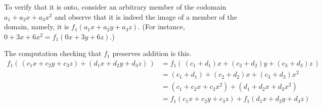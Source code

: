 \begin{exercises}
\begin{answer}
      To verify that it is onto, consider an arbitrary member of the codomain
      $a_1+a_2x+a_3x^2$ and observe that 
      it is indeed the image of a member of the
      domain, namely, it is $f_1(a_1x+a_2y+a_3z)$.
      (For instance, $0+3x+6x^2=f_1(0x+3y+6z)$.)

      The computation checking that $f_1$ preserves addition is this.
      \begin{align*}
        f_1\left(\,(c_1x+c_2y+c_3z)+(d_1x+d_2y+d_3z)\,\right)
          &=f_1\left(\,(c_1+d_1)x+(c_2+d_2)y+(c_3+d_3)z\,\right)  \\
          &=(c_1+d_1)+(c_2+d_2)x+(c_3+d_3)x^2  \\
          &=(c_1+c_2x+c_3x^2)+(d_1+d_2x+d_3x^2)  \\
          &=f_1(c_1x+c_2y+c_3z)+f_1(d_1x+d_2y+d_3z)
      \end{align*}


\end{answer}
\end{exercises}
